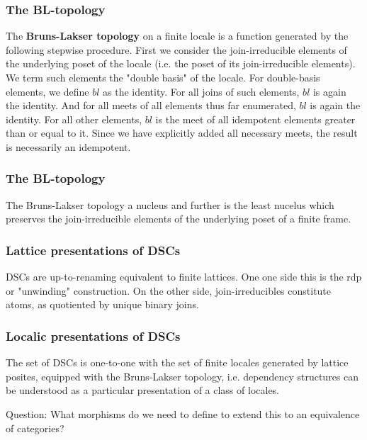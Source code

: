 \documentclass{beamer}
\begin{document}
\begin{frame}
\frametitle{The BL-topology}
\begin{definition}
The \textbf{Bruns-Lakser topology} on a finite locale is a function generated by the following stepwise procedure. First we consider the join-irreducible elements of the underlying poset of the locale (i.e. the poset of its join-irreducible elements). We term such elements the "double basis" of the locale. For double-basis elements, we define \(bl\) as the identity. For all joins of such elements, \(bl\) is again the identity. And for all meets of all elements thus far enumerated, \(bl\) is again the identity. For all other elements, \(bl\) is the meet of all idempotent elements greater than or equal to it. Since we have explicitly added all necessary meets, the result is necessarily an idempotent.
\end{definition}

\end{frame}

\begin{frame}
\frametitle{The BL-topology}
\begin{lemma}
The Bruns-Lakser topology a nucleus and further is the least nucelus which preserves the join-irreducible elements of the underlying poset of a finite frame.
\end{lemma}
\end{frame}

\begin{frame}
\frametitle{Lattice presentations of DSCs}
\begin{lemma}
DSCs are up-to-renaming equivalent to finite lattices. One one side this is the rdp or "unwinding" construction. On the other side, join-irreducibles constitute atoms, as quotiented by unique binary joins. 
\end{lemma}
\end{frame}

\begin{frame}
\frametitle{Localic presentations of DSCs}

\begin{theorem}
The set of DSCs is one-to-one with the set of finite locales generated by lattice posites, equipped with the Bruns-Lakser topology, i.e. dependency structures can be understood as a particular presentation of a class of locales.
\end{theorem}

Question: What morphisms do we need to define to extend this to an equivalence of categories? \linebreak

\end{frame}
\end{document}
